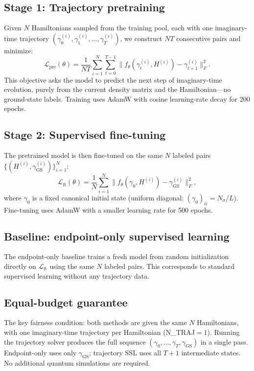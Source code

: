 \documentclass[12pt]{article}
\newcommand{\gam}{\gamma}
\newcommand{\gGS}{\gamma_{\mathrm{GS}}}
\begin{document}
\subsection{Stage 1: Trajectory pretraining}

Given $N$ Hamiltonians sampled from the training pool, each with one imaginary-time
trajectory $(\gam_0^{(i)}, \gam_1^{(i)}, \ldots, \gam_T^{(i)})$, we construct $NT$
consecutive pairs and minimize:
\begin{equation}
  \mathcal{L}_{\mathrm{pre}}(\theta) = \frac{1}{NT} \sum_{i=1}^N \sum_{t=0}^{T-1}
  \bigl\| f_\theta(\gam_t^{(i)}, H^{(i)}) - \gam_{t+1}^{(i)} \bigr\|_F^2.
\label{eq:pretrain_loss}
\end{equation}
This objective asks the model to predict the next step of imaginary-time evolution,
purely from the current density matrix and the Hamiltonian---no ground-state labels.
Training uses AdamW with cosine learning-rate decay for 200 epochs.

\subsection{Stage 2: Supervised fine-tuning}

The pretrained model is then fine-tuned on the same $N$ labeled pairs
$\{(H^{(i)}, \gGS^{(i)})\}_{i=1}^N$:
\begin{equation}
  \mathcal{L}_{\mathrm{ft}}(\theta) = \frac{1}{N}\sum_{i=1}^N
  \bigl\| f_\theta(\gam_0, H^{(i)}) - \gGS^{(i)} \bigr\|_F^2,
\label{eq:ft_loss}
\end{equation}
where $\gam_0$ is a fixed canonical initial state (uniform diagonal:
$(\gam_0)_{ii} = N_\sigma/L$).
Fine-tuning uses AdamW with a smaller learning rate for 500 epochs.

\subsection{Baseline: endpoint-only supervised learning}

The endpoint-only baseline trains a fresh model from random initialization
directly on $\mathcal{L}_\mathrm{ft}$ using the same $N$ labeled pairs.
This corresponds to standard supervised learning without any trajectory data.

\subsection{Equal-budget guarantee}

The key fairness condition: both methods are given the same $N$ Hamiltonians,
with one imaginary-time trajectory per Hamiltonian (N\_TRAJ$=1$).
Running the trajectory solver produces the full sequence
$(\gam_0, \ldots, \gam_T, \gGS)$ in a single pass.
Endpoint-only uses only $\gGS$; trajectory SSL uses all $T+1$ intermediate states.
No additional quantum simulations are required.
\end{document}
